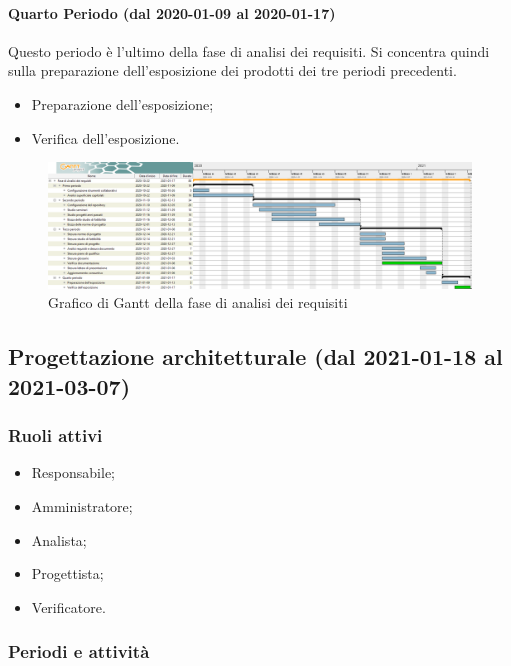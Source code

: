 \paragraph{Quarto Periodo (dal 2020-01-09 al 2020-01-17)}
Questo periodo è l'ultimo della fase di analisi dei requisiti. Si concentra quindi sulla preparazione dell'esposizione dei prodotti dei tre periodi precedenti.
\begin{itemize}
	\item Preparazione dell'esposizione;
	\item Verifica dell'esposizione.
\end{itemize}


\begin{landscape}
	\begin{figure}[H]
		\centering
		\includegraphics[width=\linewidth]{res/images/ganttFase1.png}
		\caption{Grafico di Gantt della fase di analisi dei requisiti}
		\label{fig:Gantt Analisi dei requisiti}
	\end{figure}
\end{landscape}

\subsection{Progettazione architetturale (dal 2021-01-18 al 2021-03-07)}

\subsubsection{Ruoli attivi}
\begin{itemize}
	\item Responsabile;
	\item Amministratore;
	\item Analista;
	\item Progettista;
	\item Verificatore.
\end{itemize}

\subsubsection{Periodi e attività}

